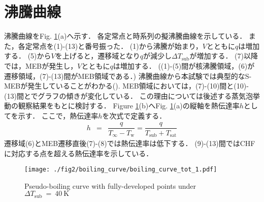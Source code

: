 \section{沸騰曲線}
沸騰曲線をFig. \ref{bc}(a)へ示す．
各定常点と時系列の擬沸騰曲線を示している．
また，各定常点を(1)-(13)と番号振った．
(1)から沸騰が始まり，$V$とともに$q$は増加する．
(5)から$V$を上げると，遷移域となり$q$が減少し$\Delta{}T_{\mathrm{sub}}$が増加する．
(7)以降では，MEBが発生し，$V$とともに$q$は増加する．
((1)-(5)間が核沸騰領域，(6)が遷移領域，(7)-(13)間がMEB領域である．)
沸騰曲線から本試験では典型的なS-MEBが発生していることがわかる(\cite{Horiuchi2021}).
MEB領域においては，(7)-(10)間と(10)-(13)間とでグラフの傾きが変化している．
この理由については後述する蒸気泡挙動の観察結果をもとに検討する．
Figure \ref{bc}(b)へFig. \ref{bc}(a)の縦軸を熱伝達率$h$としてを示す．
ここで，熱伝達率$h$を次式で定義する．
\begin{eqnarray}
  h
  &=& \dfrac{q}{T_{\infty}-T_{\mathrm{w}}}
  = \dfrac{q}{T_{\mathrm{sub}}+T_{\mathrm{sat}}}
\end{eqnarray}
遷移域(6)とMEB遷移直後(7)-(8)では熱伝達率は低下する．
(9)-(13)間ではCHFに対応する点を超える熱伝達率を示している．


\begin{figure}[btp]
  \centering
  \texttt{[image: ./fig2/boiling\_curve/boiling\_curve\_tot\_1.pdf]}
  \caption{Pseudo-boiling curve with fully-developed points under $\Delta T_{\mathrm{sub}}~=~40~\mathrm{K}$}
  \label{bc}
\end{figure}







